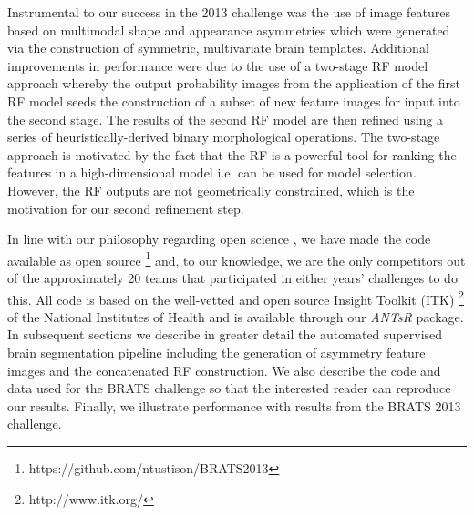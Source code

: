 \documentclass[preprint,authoryear,review,12pt]{elsarticle}
\begin{document}


Instrumental to our success in the 2013 challenge 
was the use of image features based on multimodal shape and appearance 
asymmetries which were generated via the construction of symmetric, 
multivariate brain templates.  Additional improvements in performance
were due to the use of a two-stage RF model approach
whereby the output probability images from the application of the first
RF model seeds the construction of a subset of new feature images
for input into the second stage.  The results of the second RF model
are then refined using a series of heuristically-derived binary morphological
operations.  The two-stage approach is motivated by
the fact that the RF is a powerful tool for ranking the features
in a high-dimensional model i.e. can be used for model selection.
However, the RF outputs are not geometrically constrained, which is
the motivation for our second refinement step.

In line with our philosophy regarding open science \citep{tustison2013,ince2012}, 
we have made the code available as open source%
\footnote{
https://github.com/ntustison/BRATS2013
}
and, to our knowledge, we are the only competitors out of the approximately 20 teams 
that participated in either years' challenges to do this.  All code is based
on the well-vetted and open source Insight Toolkit (ITK)%
\footnote{
http://www.itk.org/
} 
of the National Institutes of Health and is available through our \textit{ANTsR} 
package.
In subsequent sections we describe in greater detail the automated 
supervised brain segmentation pipeline including the generation of asymmetry
feature images and the concatenated RF construction.  We also
describe the code and data used for the BRATS challenge so that 
the interested reader can reproduce our results.  Finally, we 
illustrate performance with results from the BRATS 2013 challenge.
 
\end{document}
